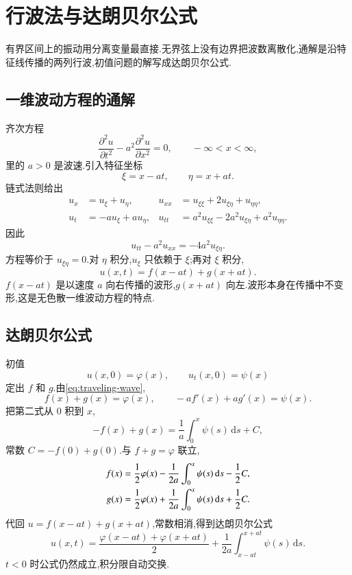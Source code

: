 \section{行波法与达朗贝尔公式}
有界区间上的振动用分离变量最直接.无界弦上没有边界把波数离散化,通解是沿特征线传播的两列行波,初值问题的解写成达朗贝尔公式.

\subsection{一维波动方程的通解}
齐次方程
\begin{equation}
  \frac{\partial^2 u}{\partial t^2}-a^2\frac{\partial^2 u}{\partial x^2}=0,
  \qquad -\infty<x<\infty,
\end{equation}
里的 $a>0$ 是波速.引入特征坐标
\begin{equation}
  \xi=x-at, \qquad \eta=x+at.
\end{equation}
链式法则给出
\begin{align}
  u_x &= u_\xi+u_\eta, &
  u_{xx} &= u_{\xi\xi}+2u_{\xi\eta}+u_{\eta\eta}, \\
  u_t &= -a u_\xi+a u_\eta, &
  u_{tt} &= a^2 u_{\xi\xi}-2a^2 u_{\xi\eta}+a^2 u_{\eta\eta}.
\end{align}
因此
\begin{equation}
  u_{tt}-a^2 u_{xx}=-4a^2 u_{\xi\eta}.
\end{equation}
方程等价于 $u_{\xi\eta}=0$.对 $\eta$ 积分,$u_\xi$ 只依赖于 $\xi$;再对 $\xi$ 积分,
\begin{equation}
  u(x,t)=f(x-at)+g(x+at).
  \label{eq:traveling-wave}
\end{equation}
$f(x-at)$ 是以速度 $a$ 向右传播的波形,$g(x+at)$ 向左.波形本身在传播中不变形,这是无色散一维波动方程的特点.

\subsection{达朗贝尔公式}
初值
\begin{equation}
  u(x,0)=\varphi(x), \qquad u_t(x,0)=\psi(x)
\end{equation}
定出 $f$ 和 $g$.由\eqref{eq:traveling-wave},
\begin{equation}
  f(x)+g(x)=\varphi(x),
  \qquad
  -a f'(x)+a g'(x)=\psi(x).
\end{equation}
把第二式从 $0$ 积到 $x$,
\begin{equation}
  -f(x)+g(x)=\frac{1}{a}\int_0^x\psi(s)\,\mathrm{d}s+C,
\end{equation}
常数 $C=-f(0)+g(0)$.与 $f+g=\varphi$ 联立,
\begin{align}
  f(x)&={\frac{1}{2}}\varphi(x)-\frac{1}{2a}\int_0^x\psi(s)\,\mathrm{d}s-{\frac{1}{2}} C, \\
  g(x)&={\frac{1}{2}}\varphi(x)+\frac{1}{2a}\int_0^x\psi(s)\,\mathrm{d}s+{\frac{1}{2}} C.
\end{align}
代回 $u=f(x-at)+g(x+at)$,常数相消,得到达朗贝尔公式
\begin{equation}
  u(x,t)
  =\frac{\varphi(x-at)+\varphi(x+at)}{2}
  +\frac{1}{2a}\int_{x-at}^{x+at}\psi(s)\,\mathrm{d}s.
  \label{eq:dalembert}
\end{equation}
$t<0$ 时公式仍然成立,积分限自动交换.


